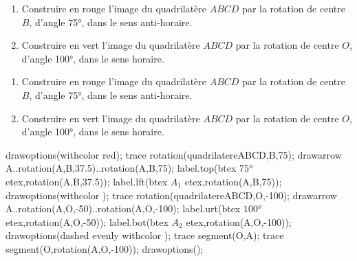 \begin{exercice*}
    \begin{enumerate}
        \item Construire en rouge l'image du quadrilatère $ABCD$ par la rotation de centre $B$, d'angle \ang{75}, dans le sens anti-horaire.
        \item Construire en vert l'image du quadrilatère $ABCD$ par la rotation de centre $O$, d'angle \ang{100}, dans le sens horaire.
    \end{enumerate}
    \hspace*{-10mm}
    \begin{Geometrie}[CoinHD={(9u,7u)}]        
        \enonceTroisiemeGTroisExoOnze
    \end{Geometrie}
\end{exercice*}
\begin{corrige}
    \begin{enumerate}
        \item Construire en rouge l'image du quadrilatère $ABCD$ par la rotation de centre $B$, d'angle \ang{75}, dans le sens anti-horaire.
        \item Construire en vert l'image du quadrilatère $ABCD$ par la rotation de centre $O$, d'angle \ang{100}, dans le sens horaire.
    \end{enumerate}

    \hspace*{-10mm}
    \begin{Geometrie}[CoinHD={(9u,7u)}]        
        \enonceTroisiemeGTroisExoOnze
        drawoptions(withcolor red);
        trace rotation(quadrilatereABCD,B,75);
        drawarrow A..rotation(A,B,37.5)..rotation(A,B,75);
        label.top(btex $\ang{75}$ etex,rotation(A,B,37.5));
        label.lft(btex $A_1$ etex,rotation(A,B,75));
        drawoptions(withcolor \myMetapostGreen);
        trace rotation(quadrilatereABCD,O,-100);         
        drawarrow A..rotation(A,O,-50)..rotation(A,O,-100);         
        label.urt(btex $\ang{100}$ etex,rotation(A,O,-50));
        label.bot(btex $A_2$ etex,rotation(A,O,-100));
        drawoptions(dashed evenly withcolor \myMetapostGreen);
        trace segment(O,A);
        trace segment(O,rotation(A,O,-100));
        drawoptions(); 
    \end{Geometrie}
\end{corrige}

